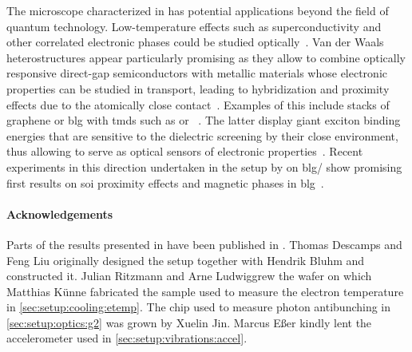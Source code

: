 The microscope characterized in \thispart has potential applications beyond the field of quantum technology.
Low-temperature effects such as superconductivity and other correlated electronic phases could be studied optically~\cite{Hadfield2016,Arora2020,Zhang2023}.
Van der Waals heterostructures appear particularly promising as they allow to combine optically responsive direct-gap semiconductors with metallic materials whose electronic properties can be studied in transport, leading to hybridization and proximity effects due to the atomically close contact~\cite{Geim2013}.
Examples of this include stacks of graphene or \gls{blg} with \glspl{tmd} such as  or ~\cite{Popert2022,Masseroni2024,Xie2024,Seiler2025}.
The latter display giant exciton binding energies that are sensitive to the dielectric screening by their close environment, thus allowing to serve as optical sensors of electronic properties~\cite{Popert2022,Tebbe2023}.
Recent experiments in this direction undertaken in the setup by \citet{Tebbe2025} on \acrshort{blg}/ show promising first results on \gls{soi} proximity effects and magnetic phases in \gls{blg}~\cite{Icking2024}.

\paragraph{Acknowledgements}
Parts of the results presented in \thispart have been published in .
Thomas Descamps and Feng Liu originally designed the setup together with Hendrik Bluhm and constructed it.
Julian Ritzmann and Arne Ludwig\sidenotemark[a] grew the wafer on which Matthias Künne fabricated the sample used to measure the electron temperature in \cref{sec:setup:cooling:etemp}.
The chip used to measure photon antibunching in \cref{sec:setup:optics:g2} was grown by Xuelin Jin.
Marcus Eßer kindly lent the accelerometer used in \cref{sec:setup:vibrations:accel}.
